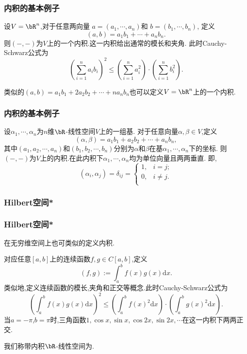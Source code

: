 \begin{frame}\frametitle{内积的基本例子}
\pp
\begin{example}
设$V=\bR^n$,对于任意两向量 $a=(a_1,\cdots,a_n)$和 $b=(b_1,\cdots,b_n)$, 定义
\[(a,b)=a_1b_1+\cdots+a_nb_n.\]
\pp
则$(-,-)$为$V$上的一个内积.这一内积给出通常的模长和夹角.
\pp
此时Cauchy-Schwarz公式为
\[\left(\sum_{i=1}^n a_ib_i\right)^2 \leq \left(\sum_{i=1}^n a_i^2\right)\cdot\left(\sum_{i=1}^n b_i^2\right).\]
\end{example}
\pp
\begin{example}
类似的$(a,b)=a_1b_1+2a_2b_2+\cdots+na_nb_n$也可以定义$V=\bR^n$上的一个内积.
\end{example}
\end{frame}






\begin{frame}\frametitle{内积的基本例子}

\pp
\begin{example}
设$\alpha_1,\cdots,\alpha_n$为$n$维$\bR$-线性空间$V$上的一组基.
\pp
对于任意向量$\alpha,\beta\in V$,定义
\[(\alpha,\beta)=a_1b_1+a_2b_2+\cdots+a_nb_n,\]
其中$(a_1,a_2,\cdots,a_n)$和$(b_1,b_2,\cdots,b_n)$分别为$\alpha$和$\beta$在基$\alpha_1,\cdots,\alpha_n$下的坐标.
\pp
则$(-,-)$为$V$上的内积.在此内积下$\alpha_1,\cdots,\alpha_n$均为单位向量且两两垂直.
\pp
即,
\[(\alpha_i,\alpha_j)=\delta_{ij}=\left\{\begin{array}{ll}
1,& i=j;\\
0,& i\neq j.\\
\end{array}\right.\]
\end{example}
\pp
{}
\end{frame}




\subsubsection{Hilbert空间*}
\begin{frame}\frametitle{Hilbert空间*}

在无穷维空间上也可类似的定义内积.
\pp
\begin{example}[无限维空间上的内积]
对应任意$[a,b]$上的连续函数$f,g\in C[a,b]$,定义
\[(f,g):=\int_a^b f(x)g(x)\mathrm{d}x.\]
\pp
类似地,定义连续函数的模长,夹角和正交等概念.此时Cauchy-Schwarz公式为
\[\left(\int_a^b f(x)g(x)\mathrm{d}x\right)^2\leq\left(\int_a^b f(x)^2\mathrm{d}x\right)\cdot\left(\int_a^b g(x)^2\mathrm{d}x\right).\]
\pp
当$a=-\pi$,$b=\pi$时,三角函数$1,\cos x,\sin x,\cos2x,\sin2x,\cdots$在这一内积下两两正交.
\end{example}
\pp
我们称带内积$\bR$-线性空间为.

\end{frame}



